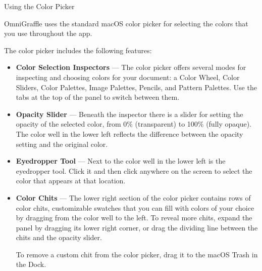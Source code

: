 \documentclass[../main.tex]{subfiles}
\begin{document}
\begin{ogsidebar}
  Using the Color Picker

  OmniGraffle uses the standard macOS color picker for selecting the colors that you use
  throughout the app.


  The color picker includes the following features:

  \begin{itemize}
    \item \textbf{Color Selection Inspectors} --- The color picker offers several modes for
      inspecting and choosing colors for your document: a Color Wheel, Color Sliders, Color
      Palettes, Image Palettes, Pencils, and Pattern Palettes. Use the tabs at the top of the
      panel to switch between them.
    \item \textbf{Opacity Slider} --- Beneath the inspector there is a slider for setting the
      opacity of the selected color, from 0\% (transparent) to 100\% (fully opaque). The color
      well in the lower left reflects the difference between the opacity setting and the
      original color.
    \item \textbf{Eyedropper Tool} --- Next to the color well in the lower left is the
      eyedropper tool. Click it and then click anywhere on the screen to select the color that
      appears at that location.
    \item \textbf{Color Chits} --- The lower right section of the color picker contains rows of
      color chits, customizable swatches that you can fill with colors of your choice by
      dragging from the color well to the left. To reveal more chits, expand the panel by
      dragging its lower right corner, or drag the dividing line between the chits and the
      opacity slider.

      To remove a custom chit from the color picker, drag it to the macOS Trash in the Dock.
  \end{itemize}
\end{ogsidebar}
\end{document}
